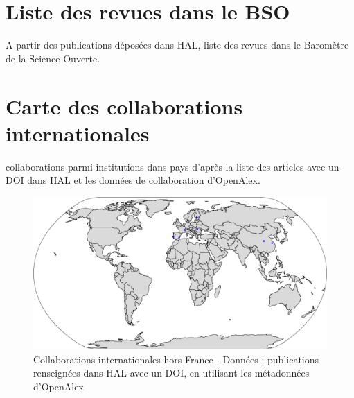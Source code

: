\documentclass[french, 11pt]{dibiso/biso}
\begin{document}






\pagebreak

\section{Liste des revues dans le BSO}

A partir des publications déposées dans HAL, liste des revues dans le Baromètre de la Science Ouverte.

{
  \footnotesize
  
}







\pagebreak

\section{Carte des collaborations internationales}

{\collaborationsnb} collaborations parmi {\institutionsnb} institutions dans {\countriesnb} pays d'après la liste des articles avec un DOI dans HAL et les données de collaboration d'OpenAlex.

\begin{figure}[!h]
  \hspace{-.1\textwidth}\includegraphics[width=1.2\textwidth]{figures/collaboration_map_world.pdf}
  \caption{Collaborations internationales hors France - Données : publications renseignées dans HAL avec un DOI, en utilisant les métadonnées d'OpenAlex}
  \label{fig_collab_map}
\end{figure}
\end{document}
